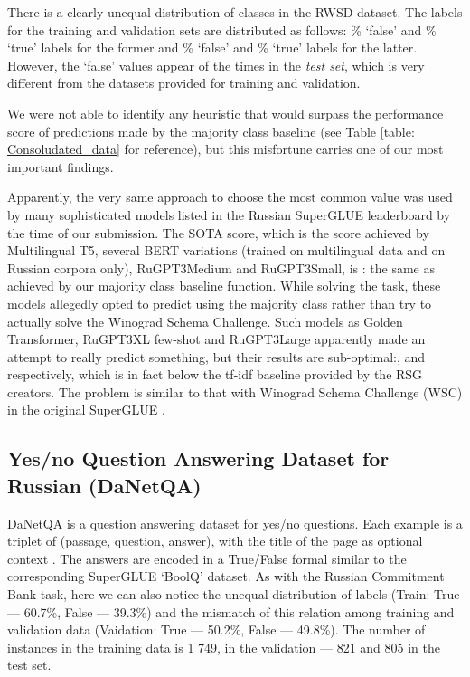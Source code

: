 \documentclass[11pt]{article}
\begin{document}
There is a clearly unequal distribution of classes in the RWSD dataset. The labels for the training and validation sets are distributed as follows: \% `false' and \% `true' labels for the former and \% `false' and \% `true' labels for the latter. However, the `false' values appear  of the times in the \textit{test set}, which is very different from the datasets provided for training and validation.

We were not able to identify any heuristic that would surpass the performance score of predictions made by the majority class baseline (see Table \ref{table: Consoludated_data} for reference), but this misfortune carries one of our most important findings. 

Apparently, the very same approach to choose the most common value was used by many sophisticated models listed in the Russian SuperGLUE leaderboard by the time of our submission. The SOTA score, which is the score achieved by Multilingual T5, several BERT variations (trained on multilingual data and on Russian corpora only), RuGPT3Medium and RuGPT3Small, is : the same as achieved by our majority class baseline function. While solving the task, these models allegedly opted to predict using the majority class rather than try to actually solve the Winograd Schema Challenge. Such models as Golden Transformer, RuGPT3XL few-shot and RuGPT3Large apparently made an attempt to really predict something, but their results are sub-optimal:,  and  respectively, which is in fact below the  tf-idf baseline provided by the RSG creators. The problem is similar to that with Winograd Schema Challenge (WSC) in the original SuperGLUE \cite{wang-etal-2018-glue}.

\subsection{Yes/no Question Answering Dataset for Russian (DaNetQA)}

DaNetQA is a question answering dataset for yes/no questions. Each example is a triplet of (passage, question, answer), with the title of the page as optional context \cite{shavrina-etal-2020-russiansuperglue}. The answers are encoded in a True/False formal similar to the corresponding SuperGLUE `BoolQ' dataset. As with the Russian Commitment Bank task, here we can also notice the unequal distribution of labels (Train: True --- 60.7\%, False --- 39.3\%) and the mismatch of this relation among training and validation data (Vaidation: True --- 50.2\%, False --- 49.8\%). 
The number of instances in the training data is 1 749, in the validation --- 821 and 805 in the test set.
\end{document}
